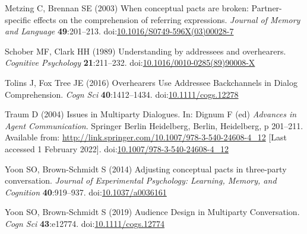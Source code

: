 \documentclass[
  english,
  a4paper,
]{article}
\newlength{\cslhangindent}
\newlength{\cslentryspacingunit} %
\newenvironment{CSLReferences}[2] %
 {%
  \setlength{\parindent}{0pt}
  \ifodd #1
  \let\oldpar\par
  \def\par{\hangindent=\cslhangindent\oldpar}
  \fi
  \setlength{\parskip}{#2\cslentryspacingunit}
 }%
 {}
\begin{document}
\begin{CSLReferences}{1}{0}
\leavevmode{}%
Metzing C, Brennan SE (2003) When conceptual pacts are broken: {Partner-specific} effects on the comprehension of referring expressions. \emph{Journal of Memory and Language} \textbf{49}:201--213. doi:\href{https://doi.org/10.1016/S0749-596X(03)00028-7}{10.1016/S0749-596X(03)00028-7}

\leavevmode{}%
Schober MF, Clark HH (1989) Understanding by addressees and overhearers. \emph{Cognitive Psychology} \textbf{21}:211--232. doi:\href{https://doi.org/10.1016/0010-0285(89)90008-X}{10.1016/0010-0285(89)90008-X}

\leavevmode{}%
Tolins J, Fox Tree JE (2016) Overhearers {Use Addressee Backchannels} in {Dialog Comprehension}. \emph{Cogn Sci} \textbf{40}:1412--1434. doi:\href{https://doi.org/10.1111/cogs.12278}{10.1111/cogs.12278}

\leavevmode{}%
Traum D (2004) Issues in {Multiparty Dialogues}. In: Dignum F (ed) \emph{Advances in {Agent Communication}}. {Springer Berlin Heidelberg}, {Berlin, Heidelberg}, p 201--211. Available from: \url{http://link.springer.com/10.1007/978-3-540-24608-4_12} {[}Last accessed 1 February 2022{]}. doi:\href{https://doi.org/10.1007/978-3-540-24608-4_12}{10.1007/978-3-540-24608-4\_12}

\leavevmode{}%
Yoon SO, Brown-Schmidt S (2014) Adjusting conceptual pacts in three-party conversation. \emph{Journal of Experimental Psychology: Learning, Memory, and Cognition} \textbf{40}:919--937. doi:\href{https://doi.org/10.1037/a0036161}{10.1037/a0036161}

\leavevmode{}%
Yoon SO, Brown‐Schmidt S (2019) Audience {Design} in {Multiparty Conversation}. \emph{Cogn Sci} \textbf{43}:e12774. doi:\href{https://doi.org/10.1111/cogs.12774}{10.1111/cogs.12774}

\end{CSLReferences}
\end{document}
